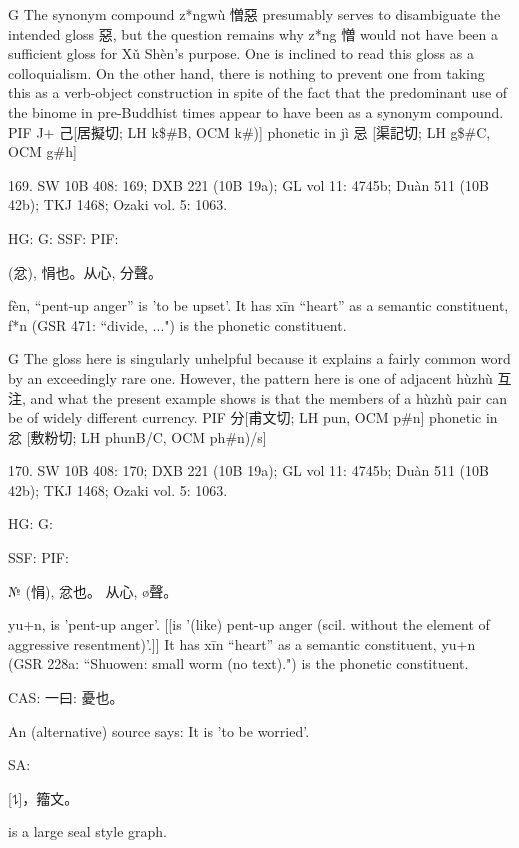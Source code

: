 G  The synonym compound z*ngwù 憎惡 presumably serves to disambiguate the intended gloss 惡, but the question remains why z*ng 憎 would not have been a sufficient gloss for Xǔ Shèn's purpose. One is inclined to read this gloss as a colloquialism. On the other hand, there is nothing to prevent one from taking this as a verb-object construction in spite of the fact that the predominant use of the binome in pre-Buddhist times appear to have been as a synonym compound.
PIF      J+ 己[居擬切; LH k\$\#B, OCM k\#)] phonetic in jì 忌 [渠記切; LH g\$\#C, OCM g\#h]



169. SW 10B 408: 169; DXB 221 (10B 19a); GL vol 11: 4745b; Duàn 511 (10B 42b); TKJ 1468; Ozaki vol. 5: 1063.


HG:
G: SSF: PIF:

  (忿),
悁也。从心, 分聲。


fèn, ``pent-up anger'' is 'to be upset'.
It has xīn ``heart'' as a semantic constituent,
f*n (GSR 471: ``divide, ...") is the phonetic constituent.

G The gloss here is singularly unhelpful because it explains a fairly common word by an exceedingly rare one. However, the pattern here is one of adjacent hùzhù 互注, and what the present example shows is that the members of a hùzhù pair can be of widely different currency.
PIF    分[甫文切; LH pun, OCM p\#n] phonetic in 忿 [敷粉切; LH phunB/C, OCM ph\#n)/s]

170. SW 10B 408: 170; DXB 221 (10B 19a); GL vol 11: 4745b; Duàn 511 (10B 42b); TKJ 1468; Ozaki vol. 5: 1063.


HG:
G:

SSF: PIF:

№ (悁),
忿也。
从心, ø聲。

yu+n,
is 'pent-up anger'. [[is '(like) pent-up anger (scil. without the element of aggressive resentment)'.]]
It has xīn ``heart'' as a semantic constituent,
yu+n (GSR 228a: ``Shuowen: small worm (no text).") is the phonetic constituent.

CAS: 一曰:
憂也。

An (alternative) source says: It is 'to be worried'.

SA:

[⥍]，籀文。

is a large seal style graph.

